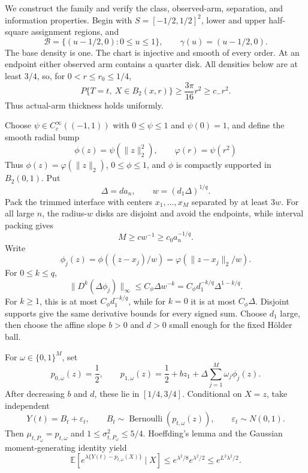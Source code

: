 We construct the family and verify the class, observed-arm, separation, and information properties.  Begin with \(S=[-1/2,1/2]^2\), lower and upper half-square assignment regions, and
\[
 \mathcal B=\{(u-1/2,0):0\leq u\leq1\},
 \qquad \gamma(u)=(u-1/2,0).
\]
The base density is one.  The chart is injective and smooth of every order.  At an endpoint either observed arm contains a quarter disk.  All densities below are at least \(3/4\), so, for \(0<r\leq r_0\leq1/4\),
\[
 P\{T=t,\ X\in B_2(x,r)\}\geq\frac{3\pi}{16}r^2\geq c_-r^2.
\]
Thus actual-arm thickness holds uniformly.

Choose \(\psi\in C_c^\infty((-1,1))\) with \(0\leq\psi\leq1\) and \(\psi(0)=1\), and define the smooth radial bump
\[
 \phi(z)=\psi(\lVert z\rVert_2^2),
 \qquad
 \varphi(r)=\psi(r^2)
\]
Thus \(\phi(z)=\varphi(\lVert z\rVert_2)\), \(0\leq\phi\leq1\), and \(\phi\) is compactly supported in \(B_2(0,1)\).  Put
\[
 \Delta=d a_n,
 \qquad w=(d_1\Delta)^{1/q}.
\]
Pack the trimmed interface with centers \(x_1,\ldots,x_M\) separated by at least \(3w\).  For all large \(n\), the radius-\(w\) disks are disjoint and avoid the endpoints, while interval packing gives
\[
 M\geq c w^{-1}\geq c_0a_n^{-1/q}.
\]
Write
\[
 \phi_j(z)=\phi((z-x_j)/w)
 =\varphi(\lVert z-x_j\rVert_2/w).
\]
For \(0\leq k\leq q\),
\[
 \lVert D^k(\Delta\phi_j)\rVert_\infty
 \leq C_\phi\Delta w^{-k}
 =C_\phi d_1^{-k/q}\Delta^{1-k/q}.
\]
For \(k\geq1\), this is at most \(C_\phi d_1^{-k/q}\), while for \(k=0\) it is at most \(C_\phi\Delta\).  Disjoint supports give the same derivative bounds for every signed sum.  Choose \(d_1\) large, then choose the affine slope \(b>0\) and \(d>0\) small enough for the fixed H\"older ball.

For \(\omega\in\{0,1\}^M\), set
\[
 p_{0,\omega}(z)=\frac12,
 \qquad
 p_{1,\omega}(z)=\frac12+bz_1
 +\Delta\sum_{j=1}^M\omega_j\phi_j(z).
\]
After decreasing \(b\) and \(d\), these lie in \([1/4,3/4]\).  Conditional on \(X=z\), take independent
\[
 Y(t)=B_t+\varepsilon_t,
 \qquad B_t\sim\operatorname{Bernoulli}(p_{t,\omega}(z)),
 \qquad \varepsilon_t\sim N(0,1).
\]
Then \(\mu_{t,P_\omega}=p_{t,\omega}\) and \(1\leq\sigma^2_{t,P_\omega}\leq5/4\).  Hoeffding's lemma and the Gaussian moment-generating identity yield
\[
 \mathbb E\!\left[e^{\lambda\{Y(t)-p_{t,\omega}(X)\}}\mid X\right]
 \leq e^{\lambda^2/8}e^{\lambda^2/2}
 \leq e^{L^2\lambda^2/2}.
\]

